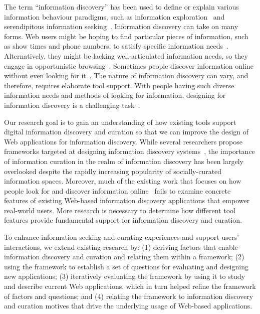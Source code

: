 \documentclass{sigchi}
\begin{document}
The term ``information discovery'' has been used to define or explain various information behaviour paradigms, such as information exploration~\cite{waterworth1991model} and serendipitous information seeking~\cite{foster2003serendipity}.  
Information discovery can take on many forms. Web users might be hoping to find particular pieces of information, such as show times and phone numbers, to satisfy specific information needs~\cite{proper1999information}. Alternatively, they might be lacking well-articulated information needs, so they engage in opportunistic browsing~\cite{lindley2012s}. Sometimes people discover information online without even looking for it~\cite{bates1986exploratory}. The nature of information discovery can vary, and therefore, requires elaborate tool support. With people having such diverse information needs and methods of looking for information, designing for information discovery is a challenging task~\cite{conaway2010designing, marchionini2006exploratory}.

Our research goal is to gain an understanding of how existing tools support digital information discovery and curation so that we can improve the design of Web applications for information discovery. While several researchers propose frameworks targeted at designing information discovery systems~\cite{proper1999information, kerne2004information}, the importance of information curation in the realm of information discovery has been largely overlooked despite the rapidly increasing popularity of socially-curated information spaces. Moreover, much of the existing work that focuses on how people look for and discover information online~\cite{bates1986exploratory, choo2000information, ellis1989behavioural, kellar2006goal, lindley2012s, morrison2001taxonomic, sellen2002knowledge} fails to examine concrete features of existing Web-based information discovery applications that empower real-world users. More research is necessary to determine how different tool features provide fundamental support for information discovery and curation.

To enhance information seeking and curating experiences and support users' interactions, we extend existing research by: (1) deriving factors that enable information discovery and curation and relating them within a framework; (2) using the framework to establish a set of questions for evaluating and designing new applications; (3) iteratively evaluating the framework by using it to study and describe current Web applications, which in turn helped refine the framework of factors and questions; and (4) relating the framework to information discovery and curation motives that drive the underlying usage of Web-based applications.
\end{document}
